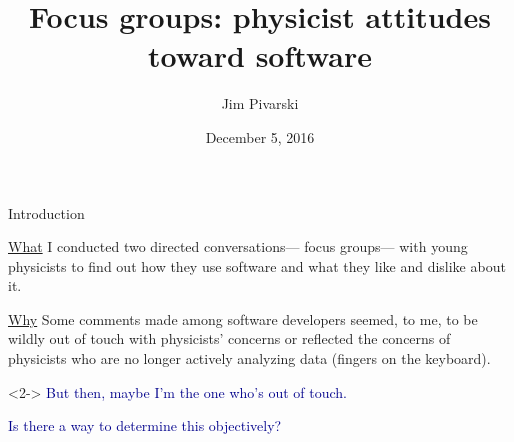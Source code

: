 \documentclass{beamer}
\title[2016-12-05-focus-groups]{Focus groups: physicist attitudes toward software}
\author{Jim Pivarski}
\institute{Princeton University -- DIANA}
\date{December 5, 2016}
\begin{document}

\begin{frame}
  \titlepage
\end{frame}



\begin{frame}{Introduction}

\begin{block}{\underline{What}}
I conducted two directed conversations--- focus groups--- with young physicists to find out how they use software and what they like and dislike about it.
\end{block}

\begin{block}{\underline{Why}}
Some comments made among software developers seemed, to me, to be wildly out of touch with physicists' concerns or reflected the concerns of physicists who are no longer actively analyzing data (fingers on the keyboard).

\begin{uncoverenv}<2->
\vspace{0.2 cm}
\textcolor{darkblue}{But then, maybe I'm the one who's out of touch.}

\vspace{0.2 cm}
\textcolor{darkblue}{Is there a way to determine this objectively?}
\end{uncoverenv}
\end{block}
\end{frame}
\end{document}

